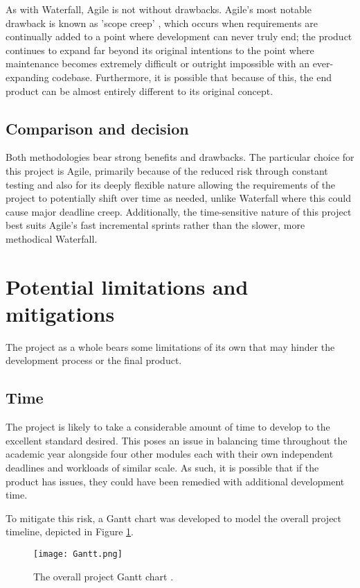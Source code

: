 \para As with Waterfall, Agile is not without drawbacks. Agile's most notable drawback is known as 'scope creep' \autocite{malsamWhatScopeCreep2024},
which occurs when requirements are continually added to a point where development can never truly end; the product continues to expand 
far beyond its original intentions to the point where maintenance becomes extremely difficult or outright impossible with an 
ever-expanding codebase. Furthermore, it is possible that because of this, the end product can be almost entirely different to its original concept.

\subsection{Comparison and decision}

Both methodologies bear strong benefits and drawbacks. The particular choice for this project is Agile, primarily because of the reduced 
risk through constant testing and also for its deeply flexible nature allowing the requirements of the project to potentially shift 
over time as needed, unlike Waterfall where this could cause major deadline creep. Additionally, the time-sensitive nature of this project 
best suits Agile's fast incremental sprints rather than the slower, more methodical Waterfall.

\section{Potential limitations and mitigations}\label{sec:Limitations}
The project as a whole bears some limitations of its own that may hinder the development process or the final product.

\subsection{Time}
The project is likely to take a considerable amount of time to develop to the excellent standard desired. This poses an issue 
in balancing time throughout the academic year alongside four other modules each with their own independent deadlines and workloads
of similar scale. As such, it is possible that if the product has issues, they could have been remedied with additional development 
time.

\para To mitigate this risk, a Gantt chart was developed to model the overall project timeline, depicted in Figure \ref{fig:Gantt}.

\begin{figure}[H]
    \centering
    \texttt{[image: Gantt.png]}
    \caption{The overall project Gantt chart \autocite{teamganttTeamGanttEasiestFREE}.\label{fig:Gantt}}
\end{figure}

